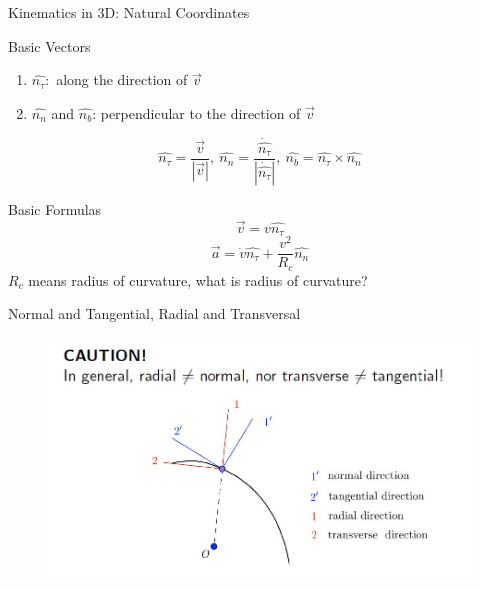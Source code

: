 \documentclass{beamer}
\begin{document}
\begin{frame}{Kinematics in 3D: Natural Coordinates}
  \begin{block}{Basic Vectors}
    \begin{enumerate}
      \item $\hat{n_\tau}:$ along the direction of $\vec{v}$
      \item $\hat{n_n}$ and $\hat{n_b}$: perpendicular to the direction of $\vec{v}$
    \end{enumerate}
    $$
      \hat{n_\tau}=\frac{\vec{v}}{|\vec{v}|},\ 
      \hat{n_n}=\frac{\dot{\hat{n_\tau}}}{|\dot{\hat{n_\tau}}|},\ 
      \hat{n_b}=\hat{n_\tau}\times \hat{n_n}
      $$
  \end{block}\pause
  \begin{block}{Basic Formulas}
    $$\vec{v}=v\hat{n_\tau}$$
    $$\vec{a}=\dot{v}\hat{n_\tau}+\frac{v^2}{R_c}\hat{n_n}$$
    $R_c$ means radius of curvature, what is radius of curvature?
  \end{block}
\end{frame}

\begin{frame}{Normal and Tangential, Radial and Transversal}
  \begin{figure}[htbp]
  \centering
  \includegraphics[width=1 \linewidth, angle =0]{Kinematics.png}
  \label{fig:1}
  \end{figure}
\end{frame}
\end{document}
